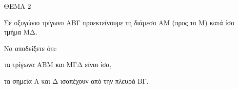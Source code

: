 
ΘΕΜΑ 2

Σε οξυγώνιο τρίγωνο ΑΒΓ προεκτείνουμε τη διάμεσο ΑΜ (προς το Μ) κατά ίσο τμήμα ΜΔ.

Να αποδείξετε ότι:

\begin{alist}
\item τα τρίγωνα ΑΒΜ και ΜΓΔ είναι ίσα, 

\item τα σημεία Α και Δ ισαπέχουν από την πλευρά ΒΓ. 
\end{alist}
